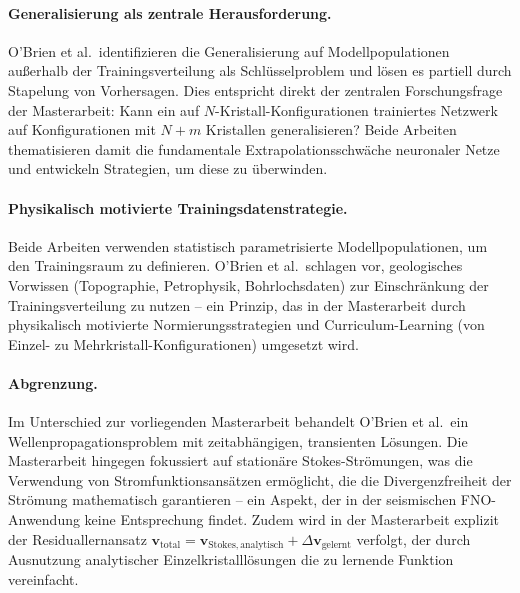 \documentclass[a4paper,12pt]{article}
\begin{document}
\paragraph{Generalisierung als zentrale Herausforderung.}
O'Brien et al.\ identifizieren die Generalisierung auf Modellpopulationen außerhalb 
der Trainingsverteilung als Schlüsselproblem und lösen es partiell durch Stapelung 
von Vorhersagen. Dies entspricht direkt der zentralen Forschungsfrage der Masterarbeit: 
Kann ein auf $N$-Kristall-Konfigurationen trainiertes Netzwerk auf Konfigurationen 
mit $N{+}m$ Kristallen generalisieren? Beide Arbeiten thematisieren damit die 
fundamentale Extrapolationsschwäche neuronaler Netze und entwickeln Strategien, 
um diese zu überwinden.

\paragraph{Physikalisch motivierte Trainingsdatenstrategie.}
Beide Arbeiten verwenden statistisch parametrisierte Modellpopulationen, um den 
Trainingsraum zu definieren. O'Brien et al.\ schlagen vor, geologisches Vorwissen 
(Topographie, Petrophysik, Bohrlochsdaten) zur Einschränkung der Trainingsverteilung 
zu nutzen -- ein Prinzip, das in der Masterarbeit durch physikalisch motivierte 
Normierungsstrategien und Curriculum-Learning (von Einzel- zu Mehrkristall-Konfigurationen) 
umgesetzt wird.

\paragraph{Abgrenzung.}
Im Unterschied zur vorliegenden Masterarbeit behandelt O'Brien et al.\ ein 
Wellenpropagationsproblem mit zeitabhängigen, transienten Lösungen. Die Masterarbeit 
hingegen fokussiert auf stationäre Stokes-Strömungen, was die Verwendung von 
Stromfunktionsansätzen ermöglicht, die die Divergenzfreiheit der Strömung 
mathematisch garantieren -- ein Aspekt, der in der seismischen FNO-Anwendung 
keine Entsprechung findet. Zudem wird in der Masterarbeit explizit der Residuallernansatz 
$\mathbf{v}_\mathrm{total} = \mathbf{v}_\mathrm{Stokes,analytisch} + \Delta\mathbf{v}_\mathrm{gelernt}$ 
verfolgt, der durch Ausnutzung analytischer Einzelkristalllösungen die zu lernende 
Funktion vereinfacht.
\end{document}
